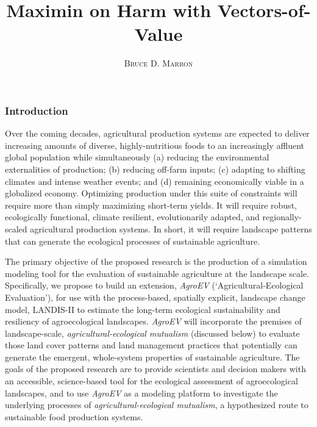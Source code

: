 \documentclass[12pt, letterpaper]{article}
\title{\vspace{-15mm}\fontsize{12pt}{10pt}\selectfont\textbf{Maximin on Harm with Vectors-of-Value}} %
\author{
\large
\textsc{Bruce D. Marron} \\                     %
\vspace{-5mm}
}
\date{}
\begin{document}

\subsubsection*{Introduction}
Over the coming decades, agricultural production systems are expected to deliver increasing amounts of diverse, highly-nutritious foods to an increasingly affluent global population while simultaneously (a) reducing the environmental externalities of production; (b) reducing off-farm inputs; (c) adapting to shifting climates and intense weather events; and (d) remaining economically viable in a globalized economy. Optimizing production under this suite of constraints will require more than simply maximizing short-term yields. It will require robust, ecologically functional, climate resilient, evolutionarily adapted, and regionally-scaled agricultural production systems. In short, it will require landscape patterns that can generate the ecological processes of sustainable agriculture.

The primary objective of the proposed research is the production of a simulation modeling tool for the evaluation of sustainable agriculture at the landscape scale. Specifically, we propose to build an extension, \textit{AgroEV} (\enquote*{Agricultural-Ecological Evaluation}), for use with the process-based, spatially explicit, landscape change model, LANDIS-II to estimate the long-term ecological sustainability and resiliency of agroecological landscapes. \textit{AgroEV} will incorporate the premises of landscape-scale, \textit{agricultural-ecological mutualism} (discussed below) to evaluate those land cover patterns and land management practices that potentially can generate the emergent, whole-system properties of sustainable agriculture. The goals of the proposed research are to provide scientists and decision makers with an accessible, science-based tool for the ecological assessment of agroecological landscapes, and to use \textit{AgroEV} as a modeling platform to investigate the underlying processes of \textit{agricultural-ecological mutualism}, a hypothesized route to sustainable food production systems.
\end{document}
